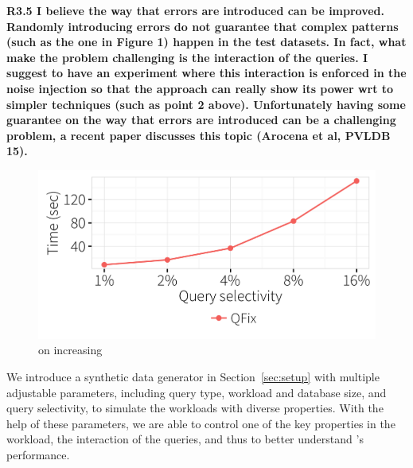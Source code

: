 \noindent \textbf{R3.5 I believe the way that errors are introduced can be improved. Randomly introducing errors do not guarantee that complex patterns (such as the one in Figure 1) happen in the test datasets. In fact, what make the problem challenging is the interaction of the queries. I suggest to have an experiment where this interaction is enforced in the noise injection so that the approach can really show its power wrt to simpler techniques (such as point 2 above). 
Unfortunately having some guarantee on the way that errors are introduced can be a challenging problem, a recent paper discusses this topic (Arocena et al, PVLDB 15).}
\begin{figure}[t]
\centering
  \includegraphics[width = \columnwidth]{figures/rangevstime}
 \caption{\sys on increasing }
  \label{f:selectivityvstime} 
\end{figure}
We introduce a synthetic data generator in Section~\ref{sec:setup} with multiple adjustable parameters, including
query type, workload and database size, and query selectivity, to simulate the workloads with diverse properties. 
With the help of these parameters, we are able to control one of the key properties in the workload, the interaction of the queries, 
and thus to better understand \sys's performance. 


